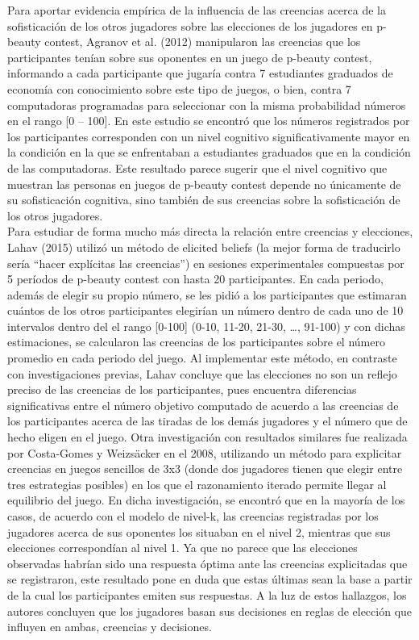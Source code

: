 Para aportar evidencia empírica de la influencia de las creencias acerca de la sofisticación de los otros jugadores sobre las elecciones de los jugadores en p-beauty contest, Agranov et al. (2012) manipularon las creencias que los participantes tenían sobre sus oponentes en un juego de p-beauty contest, informando a cada participante que jugaría contra 7 estudiantes graduados de economía con conocimiento sobre este tipo de juegos, o bien, contra 7 computadoras programadas para seleccionar con la misma probabilidad  números en el rango [0 – 100]. En este estudio se encontró que los números registrados por los participantes corresponden con un nivel cognitivo significativamente mayor en la condición en la que se enfrentaban a estudiantes graduados que en la condición de las computadoras. Este resultado parece sugerir que el nivel cognitivo que muestran las personas en juegos de p-beauty contest depende no únicamente de su sofisticación cognitiva, sino también de sus creencias sobre la sofisticación de los otros jugadores.\\

Para estudiar de forma mucho más directa la relación entre creencias y elecciones, Lahav (2015) utilizó un método de elicited beliefs (la mejor forma de traducirlo sería “hacer explícitas las creencias”) en sesiones experimentales compuestas por 5 períodos de p-beauty contest con hasta 20 participantes. En cada periodo, además de elegir su propio número, se les pidió a los participantes que estimaran cuántos de los otros participantes elegirían un número dentro de cada uno de 10 intervalos dentro del el rango [0-100] (0-10, 11-20, 21-30, …, 91-100) y con dichas estimaciones, se calcularon las creencias de los participantes sobre el número promedio en cada periodo del juego. Al implementar este método, en contraste con investigaciones previas, Lahav concluye que las elecciones no son un reflejo preciso de las creencias de los participantes, pues encuentra diferencias significativas entre el número objetivo computado de acuerdo a las creencias de los participantes acerca de las tiradas de los demás jugadores y el número que de hecho eligen en el juego.
Otra investigación con resultados similares fue realizada por Costa-Gomes y Weizsäcker en el 2008, utilizando un método para explicitar creencias en juegos sencillos de 3x3 (donde dos jugadores tienen que elegir entre tres estrategias posibles) en los que el razonamiento iterado permite llegar al equilibrio del juego. En dicha investigación, se encontró que en la mayoría de los casos, de acuerdo con el modelo de nivel-k, las creencias registradas por los jugadores acerca de sus oponentes los situaban en el nivel 2, mientras que sus elecciones correspondían al nivel 1. Ya que no parece que las  elecciones observadas habrían sido una respuesta óptima ante las creencias explicitadas que se registraron, este resultado pone en duda que estas últimas sean la base a partir de la cual los participantes emiten sus respuestas. A la luz de estos hallazgos, los autores concluyen que los jugadores basan sus decisiones en reglas de elección que influyen en ambas, creencias y decisiones.\\

